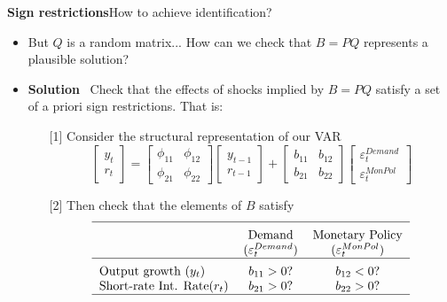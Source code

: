 \documentclass[10pt,english,t,aspectratio=169,ignorenonframetext]{beamer}
\begin{document}
\begin{frame}
{\textbf{Sign restrictions}}{How to achieve identification?}

\begin{itemize}
\item But $Q$ is a random matrix... How can we check that $B=PQ$ represents
a plausible solution?\medskip \pause

\item \textbf{Solution} \ Check that the effects of shocks implied by $B=PQ$
satisfy a set of a priori sign restrictions. That is:\medskip \pause

\begin{itemize}
\item[{[1]}] Consider the structural representation of our VAR%
\begin{equation*}
\left[ 
\begin{array}{c}
y_{t} \\ 
r_{t}%
\end{array}%
\right] =%
\begin{bmatrix}
\phi _{11} & \phi _{12} \\ 
\phi _{21} & \phi _{22}%
\end{bmatrix}%
\left[ 
\begin{array}{c}
y_{t-1} \\ 
r_{t-1}%
\end{array}%
\right] +\left[ 
\begin{array}{cc}
b_{11} & b_{12} \\ 
b_{21} & b_{22}%
\end{array}%
\right] 
\begin{bmatrix}
\varepsilon _{t}^{Demand} \\ 
\varepsilon _{t}^{MonPol}%
\end{bmatrix}%
\end{equation*}%
\pause

\item[{[2]}] Then check that the elements of $B$ satisfy\smallskip 
\begin{equation*}
\begin{tabular}{lcc}
\hline
\addlinespace & Demand & Monetary Policy \\ 
& ($\varepsilon _{t}^{Demand}$) & ($\varepsilon _{t}^{MonPol}$) \\ \hline
\addlinespace Output growth ($y_{t}$) & $b_{11}>0$? & $b_{12}<0$? \\ 
Short-rate Int. Rate($r_{t}$) & $b_{21}>0$? & $b_{22}>0$? \\ \hline
\end{tabular}%
\end{equation*}
\end{itemize}
\end{itemize}
\end{frame}
\end{document}

